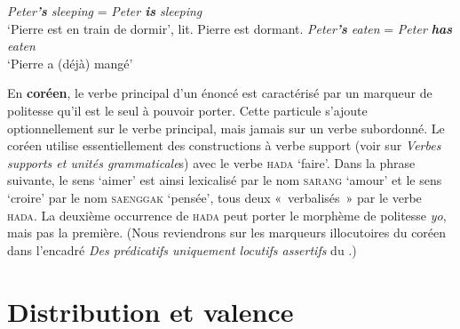 {    \ea
      \ea \textit{{Peter}\textbf{{’s}}  {sleeping}} =  \textit{{Peter} \textbf{{is}}  {sleeping}} \\\glt ‘Pierre est en train de dormir’, lit. Pierre est dormant.
      \ex \textit{{Peter}\textbf{{’s}}  {eaten}}   =   \textit{{Peter} \textbf{{has}}  {eaten}}  \\\glt ‘Pierre a (déjà) mangé’
        \z
    \z
   
   En \textbf{coréen}, le verbe principal d’un énoncé est caractérisé par un marqueur de politesse qu’il est le seul à pouvoir porter. Cette particule s’ajoute optionnellement sur le verbe principal, mais jamais sur un verbe subordonné. Le coréen utilise essentiellement des constructions à verbe support (voir  sur \textit{Verbes supports et unités grammaticale}s) avec le verbe \textsc{hada} ‘faire’. Dans la phrase suivante, le sens ‘aimer’ est ainsi lexicalisé par le nom \textsc{sarang} ‘amour’ et le sens ‘croire’ par le nom \textsc{saenggak} ‘pensée’, tous deux «~verbalisés~» par le verbe \textsc{hada}. La deuxième occurrence de \textsc{hada} peut porter le morphème de politesse \textit{yo}, mais pas la première. (Nous reviendrons sur les marqueurs illocutoires du coréen dans l’encadré \textit{Des prédicatifs uniquement locutifs assertifs} du .)

    \ea
    \z
    \z
}
\section{Distribution et valence}\label{sec:3.3.10}

